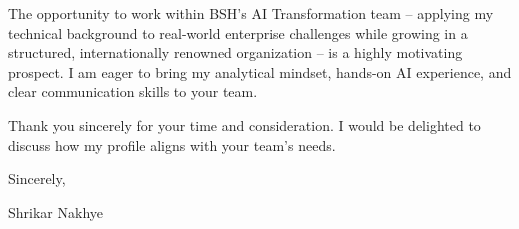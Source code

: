 \documentclass[a4paper,10pt]{article}
\begin{document}
\begin{minipage}{0.97\textwidth}
\vspace{10pt}

The opportunity to work within BSH's AI Transformation team -- applying my technical background to real-world enterprise challenges while growing in a structured, internationally renowned organization -- is a highly motivating prospect. I am eager to bring my analytical mindset, hands-on AI experience, and clear communication skills to your team.

\vspace{10pt}

Thank you sincerely for your time and consideration. I would be delighted to discuss how my profile aligns with your team's needs.

\vspace{25pt}

Sincerely,

\vspace{20pt}
Shrikar Nakhye

\end{minipage}
\end{document}
